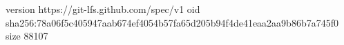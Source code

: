 version https://git-lfs.github.com/spec/v1
oid sha256:78a06f5c405947aab674ef4054b57fa65d205b94f4de41eaa2aa9b86b7a745f0
size 88107

